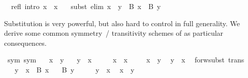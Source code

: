 \begin{isabellebody}
\isanewline
\ \ refl\ {\isacharbrackleft}intro{\isacharbrackright}{\isacharcolon}\ {\isachardoublequoteopen}x\ {\isacharequal}\ x{\isachardoublequoteclose}\ \isanewline
\ \ subst\ {\isacharbrackleft}elim{\isacharbrackright}{\isacharcolon}\ {\isachardoublequoteopen}x\ {\isacharequal}\ y\ {\isasymLongrightarrow}\ B\ x\ {\isasymLongrightarrow}\ B\ y{\isachardoublequoteclose}%
\begin{isamarkuptext}%
\noindent Substitution is very powerful, but also hard to control in
  full generality.  We derive some common symmetry~/ transitivity
  schemes of as particular consequences.%
\end{isamarkuptext}%
\isamarkuptrue%
\isamarkupfalse%
\ sym\ {\isacharbrackleft}sym{\isacharbrackright}{\isacharcolon}\isanewline
\ \ \ {\isachardoublequoteopen}x\ {\isacharequal}\ y{\isachardoublequoteclose}\isanewline
\ \ \ {\isachardoublequoteopen}y\ {\isacharequal}\ x{\isachardoublequoteclose}\isanewline
%
\isadelimproof
%
\endisadelimproof
%
\isatagproof
{}\isamarkupfalse%
\ {\isacharminus}\isanewline
\ \ \isamarkupfalse%
\ {\isachardoublequoteopen}x\ {\isacharequal}\ x{\isachardoublequoteclose}\ \isacommand{{\isachardot}{\isachardot}}\isamarkupfalse%
\isanewline
\ \ \isamarkupfalse%
\ {\isacharbackquoteopen}x\ {\isacharequal}\ y{\isacharbackquoteclose}\ \isamarkupfalse%
\ {\isachardoublequoteopen}y\ {\isacharequal}\ x{\isachardoublequoteclose}\ \isacommand{{\isachardot}{\isachardot}}\isamarkupfalse%
\isanewline
{}\isamarkupfalse%
%
\endisatagproof
{\isafoldproof}%
%
\isadelimproof
\isanewline
%
\endisadelimproof
\isanewline
{}\isamarkupfalse%
\ forw{\isacharunderscore}subst\ {\isacharbrackleft}trans{\isacharbrackright}{\isacharcolon}\isanewline
\ \ \ {\isachardoublequoteopen}y\ {\isacharequal}\ x{\isachardoublequoteclose}\ \ {\isachardoublequoteopen}B\ x{\isachardoublequoteclose}\isanewline
\ \ \ {\isachardoublequoteopen}B\ y{\isachardoublequoteclose}\isanewline
%
\isadelimproof
%
\endisadelimproof
%
\isatagproof
{}\isamarkupfalse%
\ {\isacharminus}\isanewline
\ \ \isamarkupfalse%
\ {\isacharbackquoteopen}y\ {\isacharequal}\ x{\isacharbackquoteclose}\ \isamarkupfalse%
\ {\isachardoublequoteopen}x\ {\isacharequal}\ y{\isachardoublequoteclose}\ \isacommand{{\isachardot}{\isachardot}}\isamarkupfalse%
\isanewline
\ \ \isamarkupfalse%

\end{isabellebody}
